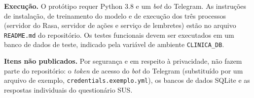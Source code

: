 \documentclass[12pt,a4paper]{extarticle}
\begin{document}
\textbf{Execução.} O protótipo requer Python 3.8 e um \textit{bot} do Telegram. As instruções de instalação, de treinamento do modelo e de execução dos três processos (servidor do Rasa, servidor de ações e serviço de lembretes) estão no arquivo \texttt{README.md} do repositório. Os testes funcionais devem ser executados em um banco de dados de teste, indicado pela variável de ambiente \texttt{CLINICA\_DB}.

\textbf{Itens não publicados.} Por segurança e em respeito à privacidade, não fazem parte do repositório: o \textit{token} de acesso do \textit{bot} do Telegram (substituído por um arquivo de exemplo, \texttt{credentials.exemplo.yml}), os bancos de dados SQLite e as respostas individuais do questionário SUS.
\end{document}
